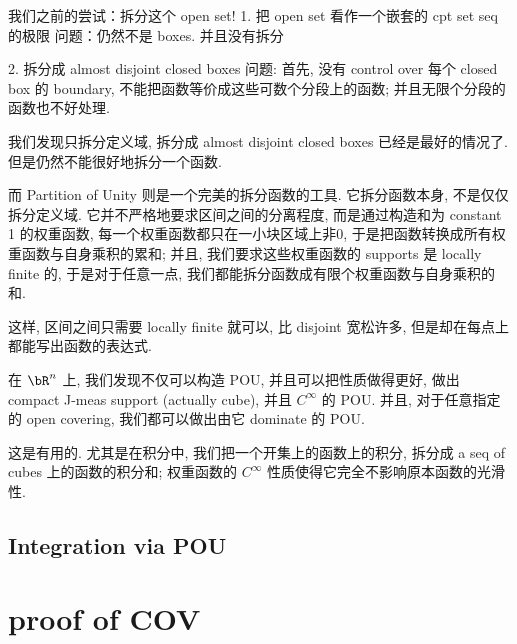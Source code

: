 \documentclass[lang=cn,11pt]{elegantbook}
\begin{document}
我们之前的尝试：拆分这个 open set!
1. 把 open set 看作一个嵌套的 cpt set seq 的极限
问题：仍然不是 boxes. 并且没有拆分

2. 拆分成 almost disjoint closed boxes
问题: 首先, 没有 control over 每个 closed box 的 boundary, 不能把函数等价成这些可数个分段上的函数; 并且无限个分段的函数也不好处理.


我们发现只拆分定义域, 拆分成 almost disjoint closed boxes 已经是最好的情况了. 但是仍然不能很好地拆分一个函数.


而 Partition of Unity 则是一个完美的拆分函数的工具. 它拆分函数本身, 不是仅仅拆分定义域. 它并不严格地要求区间之间的分离程度, 而是通过构造和为 constant 1 的权重函数, 每一个权重函数都只在一小块区域上非0, 于是把函数转换成所有权重函数与自身乘积的累和; 并且, 我们要求这些权重函数的 supports 是 locally finite 的, 于是对于任意一点, 我们都能拆分函数成有限个权重函数与自身乘积的和. 

这样, 区间之间只需要 locally finite 就可以, 比 disjoint 宽松许多, 但是却在每点上都能写出函数的表达式. 


在 $\bR^n$ 上, 我们发现不仅可以构造 POU, 并且可以把性质做得更好, 做出 compact J-meas support (actually cube), 并且 $C^\infty$ 的 POU. 并且, 对于任意指定的 open covering, 我们都可以做出由它 dominate 的 POU.

这是有用的. 尤其是在积分中, 我们把一个开集上的函数上的积分, 拆分成 a seq of cubes 上的函数的积分和; 权重函数的 $C^\infty$ 性质使得它完全不影响原本函数的光滑性.




\subsection{Integration via POU}





\section{proof of COV}
\end{document}
